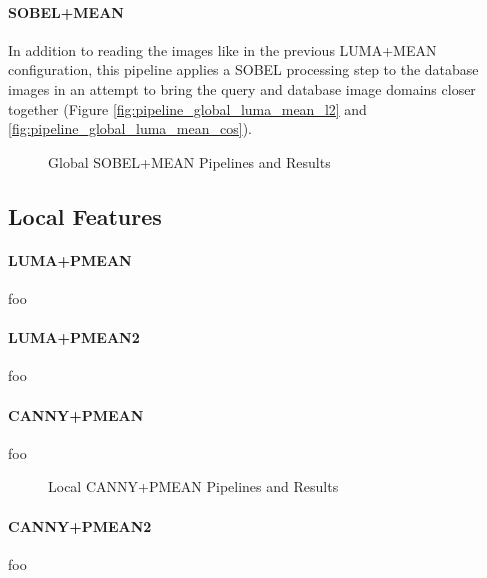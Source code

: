 \paragraph{SOBEL+MEAN}

In addition to reading the images like in the previous LUMA+MEAN configuration,
this pipeline applies a SOBEL processing step to the database images in an
attempt to bring the query and database image domains closer together (Figure
\ref{fig:pipeline_global_luma_mean_l2} and
\ref{fig:pipeline_global_luma_mean_cos}).

\begin{figure}[h]
    \centering
    \quad
    \quad
    \caption[Global SOBEL+MEAN Pipelines and Results]{
        Global SOBEL+MEAN Pipelines and Results
    }
    \label{fig:pipeline_global_luma_sobel_mean}
\end{figure}

\subsection{Local Features}

\paragraph{LUMA+PMEAN}

foo

\paragraph{LUMA+PMEAN2}

foo

\paragraph{CANNY+PMEAN}

foo

\begin{figure}[h]
    \centering
    \quad
    \quad
    \caption[Local CANNY+PMEAN Pipelines and Results]{
        Local CANNY+PMEAN Pipelines and Results
    }
    \label{fig:pipeline_local_luma_canny_pmean}
\end{figure}

\paragraph{CANNY+PMEAN2}

foo
